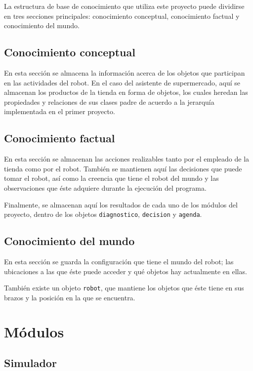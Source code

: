 \documentclass[11pt]{article}
\begin{document}
La estructura de base de conocimiento que utiliza este proyecto puede dividirse en tres secciones principales: conocimiento conceptual, conocimiento factual y conocimiento del mundo.

\subsection{Conocimiento conceptual}

En esta sección se almacena la información acerca de los objetos que participan en las actividades del robot. En el caso del asistente de supermercado, aquí se almacenan los productos de la tienda en forma de objetos, los cuales heredan las propiedades y relaciones de sus clases padre de acuerdo a la jerarquía implementada en el primer proyecto.

\subsection{Conocimiento factual}

En esta sección se almacenan las acciones realizables tanto por el empleado de la tienda como por el robot. También se mantienen aquí las decisiones que puede tomar el robot, así como la creencia que tiene el robot del mundo y las observaciones que éste adquiere durante la ejecución del programa.

Finalmente, se almacenan aquí los resultados de cada uno de los módulos del proyecto, dentro de los objetos \texttt{diagnostico}, \texttt{decision} y \texttt{agenda}.

\subsection{Conocimiento del mundo}

En esta sección se guarda la configuración que tiene el mundo del robot; las ubicaciones a las que éste puede acceder y qué objetos hay actualmente en ellas.

También existe un objeto \texttt{robot}, que mantiene los objetos que éste tiene en sus brazos y la posición en la que se encuentra.

\section{Módulos}

\subsection{Simulador}
\end{document}
